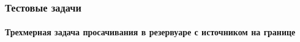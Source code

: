 \begin{frame}
\frametitle{Тестовые задачи}
\framesubtitle{Трехмерная задача просачивания в резервуаре с источником на границе}
\begin{center}
\begin{figure}
\end{figure}
  \end{center}
\end{frame}


